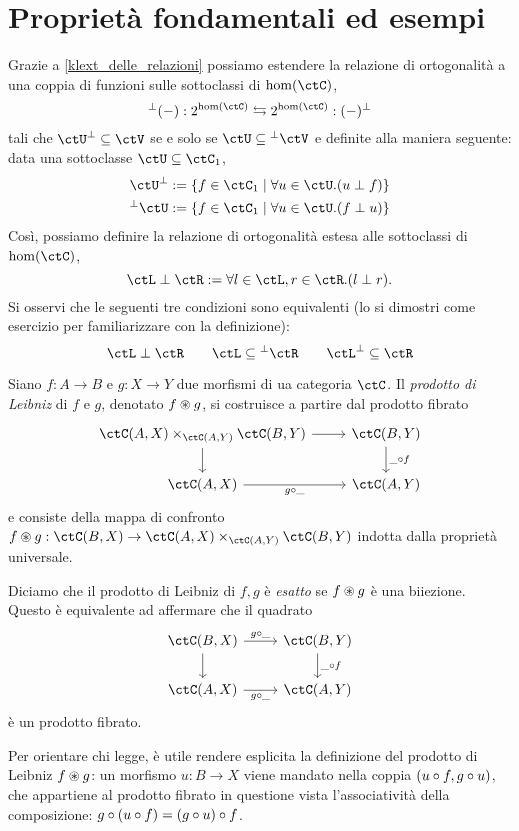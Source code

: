\section[Proprietà ed esempi]{Proprietà fondamentali ed esempi}
\begin{remark}
	Grazie a \ref{klext_delle_relazioni} possiamo estendere la relazione di ortogonalità a una coppia di funzioni sulle sottoclassi di \(\hom(\ctC)\),
	\[\lort{(-)} : 2^{\hom(\ctC)} \leftrightarrows 2^{\hom(\ctC)} : \rort{(-)}\]
	tali che \(\rort\ctU\subseteq\ctV\) se e solo se \(\ctU\subseteq\lort\ctV\) e definite alla maniera seguente: data una sottoclasse \(\ctU\subseteq \ctC_1\),
	\begin{gather*}
		\rort{\ctU} := \{f\in\ctC_1\mid \forall u\in\ctU.(u\perp f)\}\\
		\lort{\ctU} := \{f\in\ctC_1\mid \forall u\in\ctU.(f\perp u)\}
	\end{gather*}
	Così, possiamo definire la relazione di ortogonalità estesa alle sottoclassi di \(\hom(\ctC)\),
	\[\ctL\perp \ctR := \forall l\in\ctL,r\in\ctR.(l\perp r).\]
	Si osservi che le seguenti tre condizioni sono equivalenti (lo si dimostri come esercizio per familiarizzare con la definizione):
	\[\ctL\perp\ctR\qquad \ctL\subseteq\lort\ctR\qquad \rort\ctL\subseteq \ctR\]
\end{remark}
\begin{definition}
	Siano \(f : A \to B\) e \(g : X\to Y\) due morfismi di ua categoria \(\ctC\). Il \emph{prodotto di Leibniz} di \(f\) e \(g\), denotato \(f\oast g\), si costruisce a partire dal prodotto fibrato
	\[
		\begin{tikzcd}
			\pull {\Hom{\ctC}(A,X)}{\Hom{\ctC}(B,Y)}{\Hom{\ctC}(A,Y)} \ar[r]\ar[d] & \Hom{\ctC}(B,Y) \ar[d, "\_\cmp f"]\\
			\Hom{\ctC}(A,X) \ar[r, "g\cmp\_"'] & \Hom{\ctC}(A,Y)
		\end{tikzcd}
	\]
	e consiste della mappa di confronto \(f\oast g : \Hom{\ctC}(B,X) \to \pull {\Hom{\ctC}(A,X)}{\Hom{\ctC}(B,Y)}{\Hom{\ctC}(A,Y)}\) indotta dalla proprietà universale.

	Diciamo che il prodotto di Leibniz di \(f,g\) è \emph{esatto} se \(f\oast g\) è una biiezione. Questo è equivalente ad affermare che il quadrato
	\[
		\begin{tikzcd}
			\Hom{\ctC}(B,X) \ar[d]\ar[r,"g\cmp\_"]& \Hom{\ctC}(B,Y)\ar[d, "\_\cmp f"]\\
			\Hom{\ctC}(A,X) \ar[r, "g\cmp\_"'] & \Hom{\ctC}(A,Y)
		\end{tikzcd}
	\]
	è un prodotto fibrato.
\end{definition}
Per orientare chi legge, è utile rendere esplicita la definizione del prodotto di Leibniz \(f\oast g\): un morfismo \(u : B\to X\) viene mandato nella coppia \((u\circ f, g\circ u)\), che appartiene al prodotto fibrato in questione vista l'associatività della composizione: \(g\circ (u\circ f) = (g\circ u)\circ f\).


